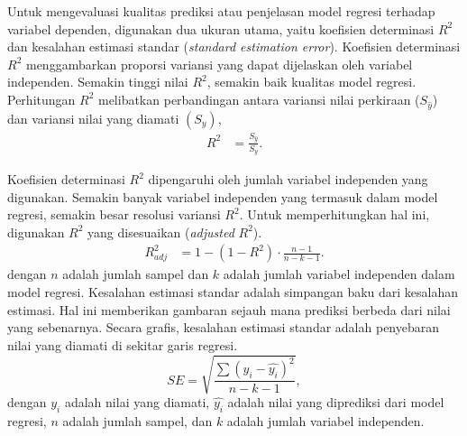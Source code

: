 \begin{spacing}{1.5}
		Untuk mengevaluasi kualitas prediksi atau penjelasan model regresi terhadap variabel dependen, digunakan dua ukuran utama, yaitu koefisien determinasi $R^2$ dan kesalahan estimasi standar (\textit{standard estimation error}). Koefisien determinasi $R^2$ menggambarkan proporsi variansi yang dapat dijelaskan oleh variabel independen. Semakin tinggi nilai $R^2$, semakin baik kualitas model regresi. Perhitungan $R^2$ melibatkan perbandingan antara variansi nilai perkiraan ($S_{\hat{y}}$) dan variansi nilai yang diamati $(S_y)$,
		\begin{equation}
			\begin{aligned}
				R^2 &= \frac{S_{\hat{y}}}{S_y}.
			\end{aligned}
		\end{equation}
	
		Koefisien determinasi $R^2$  dipengaruhi oleh jumlah variabel independen yang digunakan. Semakin banyak variabel independen yang termasuk dalam model regresi, semakin besar resolusi variansi $R^2$. Untuk memperhitungkan hal ini, digunakan $R^2$ yang disesuaikan (\textit{adjusted }$R^2$).
		\begin{equation}
			\begin{aligned}
				R^2_{adj} &= 1-(1-R^2)\cdot\frac{n-1}{n-k-1}.
			\end{aligned}
		\end{equation}
		dengan $n$ adalah jumlah sampel dan $k$ adalah jumlah variabel independen dalam model regresi. Kesalahan estimasi standar adalah simpangan baku dari kesalahan estimasi. Hal ini memberikan gambaran sejauh mana prediksi berbeda dari nilai yang sebenarnya. Secara grafis, kesalahan estimasi standar adalah penyebaran nilai yang diamati di sekitar garis regresi.
		\begin{equation}
				SE = \sqrt{\frac{\sum (y_i-\hat{y_i})^2}{n-k-1}},				
		\end{equation}
		dengan $y_i$ adalah nilai yang diamati, $\hat{y_i}$ adalah nilai yang diprediksi dari model regresi, $n$ adalah jumlah sampel, dan $k$ adalah jumlah variabel independen.
\end{spacing}
\vspace{-0.5pc}
